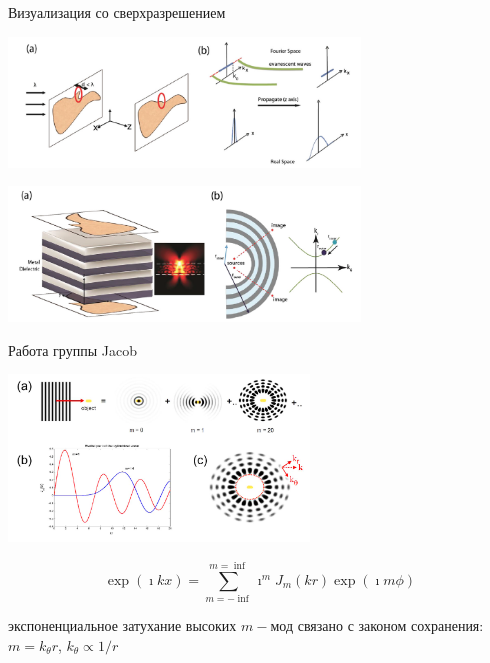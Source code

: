 \documentclass[9pt, compress, xcolor=table]{beamer}
\begin{document}
\begin{frame}{Визуализация со сверхразрешением}
\begin{center}
\includegraphics[width=0.7\textwidth]{neg_ref_n4}

\includegraphics[width=0.7\textwidth]{neg_ref_n1}
\end{center}
\end{frame}


\begin{frame}{Работа группы Jacob}
\begin{center}
\includegraphics[width=8cm]{neg_ref_43}
\end{center}
{\scriptsize
\begin{center}
\begin{equation*}
\exp (\imath k x) = \sum_{m=-\inf}^{m=\inf} \imath^m J_m(kr) \exp(\imath m \phi)
\end{equation*}
\end{center}
экспоненциальное затухание высоких $m-$мод связано с законом сохранения: $m=k_{\theta}r$,
$k_{\theta}\propto 1/r$}
\end{frame}
\end{document}

